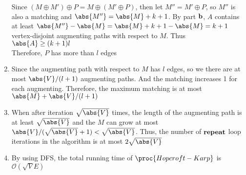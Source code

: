 \begin{enumerate}
		Since $(M \oplus M') \oplus P = M \oplus (M' \oplus P)$, then let $M'' = M' \oplus P$, so $M''$ is also a matching and $\abs{M''} = \abs{M} + k + 1$. By part $\bf{b}$, $A$ contains at least $\abs{M''} - \abs{M} = \abs{M} + k + 1 - \abs{M} = k + 1$ vertex-disjoint augmenting paths with respect to $M$. Thus $\abs{A} \geq (k + 1)l$ \\
		Therefore, $P$ has more than $l$ edges
	\item	Since the augmenting path with respect to $M$ has $l$ edges, so we there are at most $\abs{V}/(l + 1)$ augmenting paths. And the matching increases 1 for each augmenting. Therefore, the maximum matching is at most $\abs{M} + \abs{V}/(l + 1)$
	\item	When after iteration $\sqrt{\abs{V}}$ times, the length of the augmenting path is at least $\sqrt{\abs{V}}$ and the $M$ can grow at most $\abs{V} / (\sqrt{\abs{V}} + 1) < \sqrt{\abs{V}}$. Thus, the number of $\bf{repeat}$ loop iterations in the algorithm is at most $2\sqrt{\abs{V}}$
	\item	By using DFS, the total running time of $\proc{Hopcroft-Karp}$ is $\mathcal{O}(\sqrt{V}E)$
\end{enumerate}

